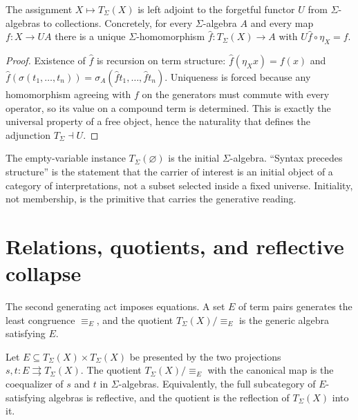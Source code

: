 \begin{theorem}
\label{thm:ontology-kernel-generation-free-functor}
The assignment $X\mapsto T_\Sigma(X)$ is left adjoint to the forgetful functor
$U$ from $\Sigma$-algebras to collections.  Concretely, for every
$\Sigma$-algebra $A$ and every map $f:X\to U A$ there is a unique
$\Sigma$-homomorphism $\hat f:T_\Sigma(X)\to A$ with $U\hat f\circ\eta_X=f$.
\end{theorem}

\begin{proof}
Existence of $\hat f$ is recursion on term structure: $\hat f(\eta_X x)=f(x)$
and $\hat f(\sigma(t_1,\dots,t_n))=\sigma_A(\hat f t_1,\dots,\hat f t_n)$.
Uniqueness is forced because any homomorphism agreeing with $f$ on the
generators must commute with every operator, so its value on a compound term is
determined.  This is exactly the universal property of a free object, hence the
naturality that defines the adjunction $T_\Sigma\dashv U$.
\end{proof}

\begin{principle}
\label{prin:ontology-kernel-initiality-primitive}
The empty-variable instance $T_\Sigma(\varnothing)$ is the initial
$\Sigma$-algebra.  ``Syntax precedes structure'' is the statement that the
carrier of interest is an initial object of a category of interpretations, not
a subset selected inside a fixed universe.  Initiality, not membership, is the
primitive that carries the generative reading.
\end{principle}

\section{Relations, quotients, and reflective collapse}
\label{sec:ontology-kernel-relations-quotients}

The second generating act imposes equations.  A set $E$ of term pairs generates
the least congruence $\equiv_E$, and the quotient $T_\Sigma(X)/\equiv_E$ is the
generic algebra satisfying $E$.

\begin{theorem}
\label{thm:ontology-kernel-quotient-coequalizer}
Let $E\subseteq T_\Sigma(X)\times T_\Sigma(X)$ be presented by the two
projections $s,t:E\rightrightarrows T_\Sigma(X)$.  The quotient
$T_\Sigma(X)/\equiv_E$ with the canonical map is the coequalizer of $s$ and
$t$ in $\Sigma$-algebras.  Equivalently, the full subcategory of $E$-satisfying
algebras is reflective, and the quotient is the reflection of $T_\Sigma(X)$
into it.
\end{theorem}

